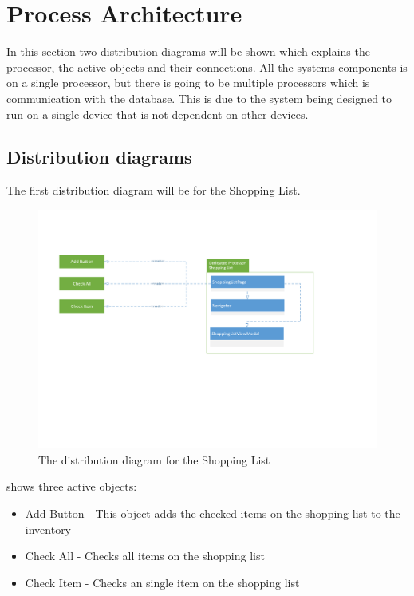 \section{Process Architecture}
In this section two distribution diagrams will be shown which explains the processor, the active objects and their connections. All the systems components is on a single processor, but there is going to be multiple processors which is communication with the database. This is due to the system being designed to run on a single device that is not dependent on other devices.

\subsection{Distribution diagrams}
The first distribution diagram will be for the Shopping List.

\begin{figure}[H]
\includegraphics[width=\linewidth]{Grafik/FoodPlanner/DistributionShoppingList}
\centering
\caption{The distribution diagram for the Shopping List}
\label{SLD}
\end{figure}

 shows three active objects:
\begin{itemize}
\item Add Button 
- This object adds the checked items on the shopping list to the inventory
\item Check All 
- Checks all items on the shopping list 
\item Check Item 
- Checks an single item on the shopping list
\end{itemize}

